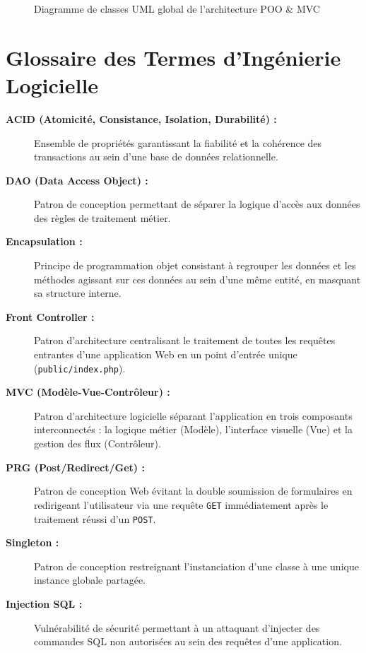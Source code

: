 \documentclass[11pt,a4paper,oneside]{report}
\begin{document}
\begin{figure}[H]
{
    }
    \caption{Diagramme de classes UML global de l'architecture POO \& MVC}
    \label{fig:diagramme_uml_global}
\end{figure}

\chapter{Glossaire des Termes d'Ingénierie Logicielle}
\label{anx:glossaire}

\begin{description}
    \item[\textbf{ACID (Atomicité, Consistance, Isolation, Durabilité) :}] Ensemble de propriétés garantissant la fiabilité et la cohérence des transactions au sein d'une base de données relationnelle.
    \item[\textbf{DAO (Data Access Object) :}] Patron de conception permettant de séparer la logique d'accès aux données des règles de traitement métier.
    \item[\textbf{Encapsulation :}] Principe de programmation objet consistant à regrouper les données et les méthodes agissant sur ces données au sein d'une même entité, en masquant sa structure interne.
    \item[\textbf{Front Controller :}] Patron d'architecture centralisant le traitement de toutes les requêtes entrantes d'une application Web en un point d'entrée unique (\texttt{public/index.php}).
    \item[\textbf{MVC (Modèle-Vue-Contrôleur) :}] Patron d'architecture logicielle séparant l'application en trois composants interconnectés : la logique métier (Modèle), l'interface visuelle (Vue) et la gestion des flux (Contrôleur).
    \item[\textbf{PRG (Post/Redirect/Get) :}] Patron de conception Web évitant la double soumission de formulaires en redirigeant l'utilisateur via une requête \texttt{GET} immédiatement après le traitement réussi d'un \texttt{POST}.
    \item[\textbf{Singleton :}] Patron de conception restreignant l'instanciation d'une classe à une unique instance globale partagée.
    \item[\textbf{Injection SQL :}] Vulnérabilité de sécurité permettant à un attaquant d'injecter des commandes SQL non autorisées au sein des requêtes d'une application.
\end{description}
\end{document}
